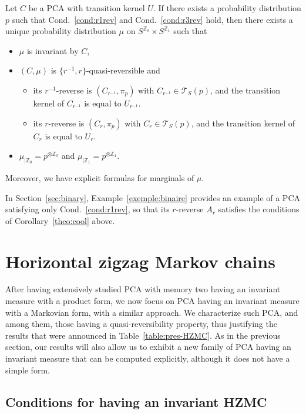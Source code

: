 \documentclass[AHL,Unicode,longabstracts]{cedram}
\newcounter{a}
\newcommand{\Cond}{Cond.}
\newcommand{\triang}[2]{\mathcal{T}_{#1} \left(#2 \right)}
\newcommand{\ZZ}{\mathbb{Z}}
\begin{document}
\begin{coro}\label{theo:cool}
Let $C$ be a PCA with transition kernel $U$. If there exists a probability distribution $p$ such that \Cond~\ref{cond:r1rev} and \Cond~\ref{cond:r3rev} hold, then there exists a unique probability distribution $\mu$ on $S^{\ZZ_0} \times S^{\ZZ_{1}}$ such that
\begin{itemize}
\item $\mu$ is invariant by $C$,
\item $(C,\mu)$ is $\{r^{-1},r\}$-quasi-reversible and
\begin{itemize}
\item its $r^{-1}$-reverse is $(C_{r^{-1}},\pi_p)$ with $C_{r^{-1}} \in \triang{S}{p}$, and the transition kernel of $C_{r^{-1}}$ is equal to $U_{r^{-1}}$.
\item its $r$-reverse is $(C_{r},\pi_p)$ with $C_{r} \in \triang{S}{p}$, and the transition kernel of $C_r$ is equal to $U_r$.
\end{itemize}
\item $\mu_{|\ZZ_0} = p^{\otimes \ZZ_0}$ and $\mu_{|\ZZ_{1}} = p^{\otimes \ZZ_{1}}$.
\end{itemize}
Moreover, we have explicit formulas for marginals of $\mu$.
\end{coro}

In Section~\ref{sec:binary}, Example~\ref{exemple:binaire} provides an example of a PCA satisfying only \Cond~\ref{cond:r1rev}, so that its $r$-reverse $A_r$ satisfies the conditions of Corollary~\ref{theo:cool} above.

\section{Horizontal zigzag Markov chains}\label{sec:markov}

After having extensively studied PCA with memory two having an invariant measure with a product form, we now focus on PCA having an invariant measure with a Markovian form, with a similar approach. We characterize such PCA, and among them, those having a quasi-reversibility property, thus justifying the results that were announced in Table~\ref{table:pres-HZMC}. As in the previous section, our results will also allow us to exhibit a new family of PCA having an invariant measure that can be computed explicitly, although it does not have a simple form.

\subsection{Conditions for having an invariant HZMC} \label{sec:invHZMC}
\end{document}
